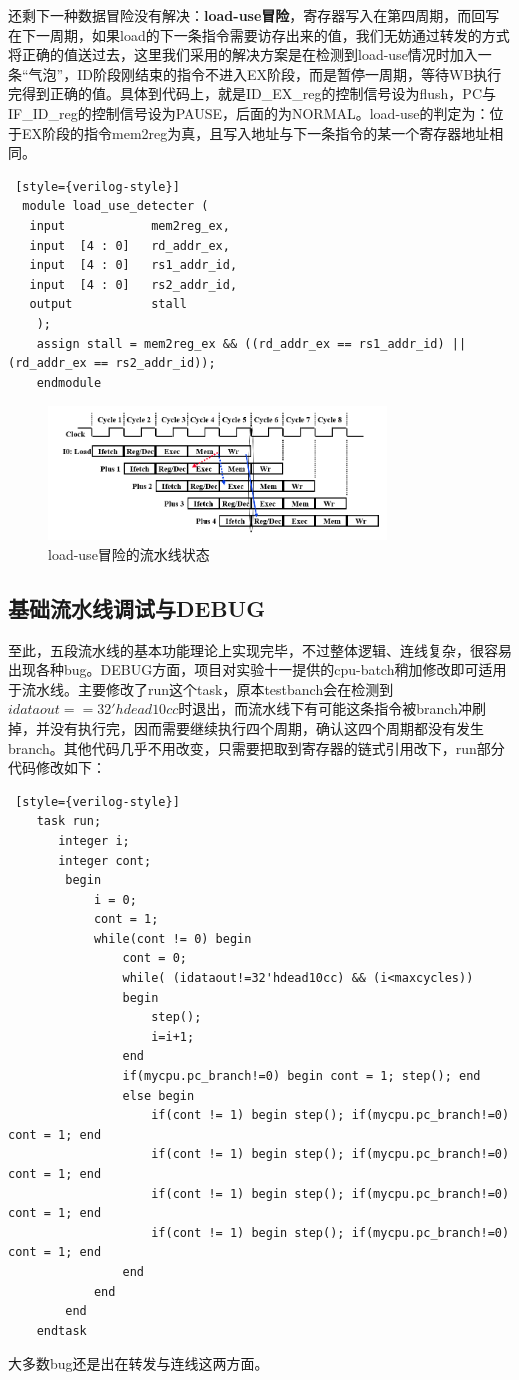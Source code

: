 \documentclass[]{article}
\begin{document}
  
  还剩下一种数据冒险没有解决：\textbf{load-use冒险}，寄存器写入在第四周期，而回写在下一周期，如果load的下一条指令需要访存出来的值，我们无妨通过转发的方式将正确的值送过去，这里我们采用的解决方案是在检测到load-use情况时加入一条“气泡”，ID阶段刚结束的指令不进入EX阶段，而是暂停一周期，等待WB执行完得到正确的值。具体到代码上，就是ID\_EX\_reg的控制信号设为flush，PC与IF\_ID\_reg的控制信号设为PAUSE，后面的为NORMAL。load-use的判定为：位于EX阶段的指令mem2reg为真，且写入地址与下一条指令的某一个寄存器地址相同。
  \begin{lstlisting} [style={verilog-style}]
  module load_use_detecter (
   input            mem2reg_ex,
   input  [4 : 0]   rd_addr_ex,
   input  [4 : 0]   rs1_addr_id,
   input  [4 : 0]   rs2_addr_id,
   output           stall
    );
    assign stall = mem2reg_ex && ((rd_addr_ex == rs1_addr_id) || (rd_addr_ex == rs2_addr_id));
    endmodule
  \end{lstlisting}
  \begin{figure}[htb]
      \centering
      \includegraphics[width=0.8\textwidth]{load-use.png}
      \caption{load-use冒险的流水线状态}
      \label{fig:load-use}
  \end{figure}
  \subsection{基础流水线调试与DEBUG}
  至此，五段流水线的基本功能理论上实现完毕，不过整体逻辑、连线复杂，很容易出现各种bug。DEBUG方面，项目对实验十一提供的cpu-batch稍加修改即可适用于流水线。主要修改了run这个task，原本testbanch会在检测到$idataout==32'hdead10cc$时退出，而流水线下有可能这条指令被branch冲刷掉，并没有执行完，因而需要继续执行四个周期，确认这四个周期都没有发生branch。其他代码几乎不用改变，只需要把取到寄存器的链式引用改下，run部分代码修改如下：
  \begin{lstlisting} [style={verilog-style}]
    task run;
       integer i;
       integer cont;
    	begin
    	   	i = 0;
    		cont = 1;
    	   	while(cont != 0) begin
    		   	cont = 0;
    			while( (idataout!=32'hdead10cc) && (i<maxcycles))
    			begin
    				step();
    				i=i+1;
    			end
    			if(mycpu.pc_branch!=0) begin cont = 1; step(); end
    			else begin
    				if(cont != 1) begin step(); if(mycpu.pc_branch!=0) cont = 1; end
    				if(cont != 1) begin step(); if(mycpu.pc_branch!=0) cont = 1; end
    				if(cont != 1) begin step(); if(mycpu.pc_branch!=0) cont = 1; end
    				if(cont != 1) begin step(); if(mycpu.pc_branch!=0) cont = 1; end
    			end
    		end
    	end
    endtask
  \end{lstlisting}  
  大多数bug还是出在转发与连线这两方面。
  
\end{document}
